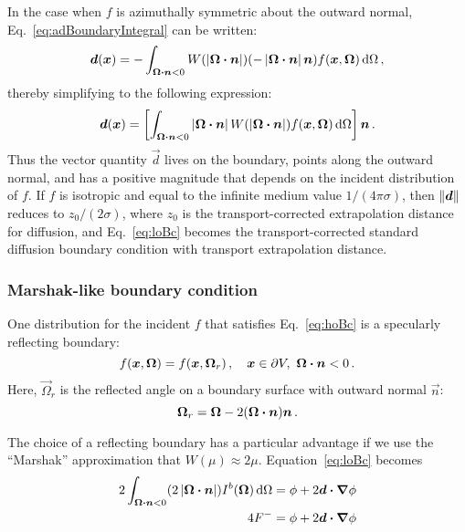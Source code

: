In the case when $f$ is azimuthally symmetric about the outward normal,
Eq.~\eqref{eq:adBoundaryIntegral} can be written:
\begin{equation*}
  \bm{d}(\bm{x}) = -\int_{\bm{\Omega}\bm{\cdot}\bm{n} < 0} W(\left| \bm{\Omega}\bm{\cdot}\bm{n} \right|)
  (-\left|  \bm{\Omega} \bm{\cdot} \bm{n} \right| \bm{n})
  f(\bm{x}, \bm{\Omega}) \mathop{}\!\mathrm{d}\Omega\,,
\end{equation*}
thereby simplifying to the following expression:
\begin{equation} \label{eq:adBoundaryIntegral2}
  \bm{d}(\bm{x})
  = \left[ \int_{\bm{\Omega}\bm{\cdot}\bm{n} < 0}
  \left| \bm{\Omega}\bm{\cdot}\bm{n} \right| W(\left| \bm{\Omega}\bm{\cdot}\bm{n} \right|)
  f(\bm{x}, \bm{\Omega}) \mathop{}\!\mathrm{d}\Omega\right] \bm{n}\,.
\end{equation}
Thus the vector quantity $\vec{d}$ lives on the boundary, points along the
outward normal, and has a positive magnitude that depends on the incident
distribution of $f$. If $f$ is isotropic and equal to the infinite medium value
$1/(4\pi\sigma)$, then $\left\| \bm{d} \right\|$ reduces to $z_0 / (2 \sigma)$, where
$z_0$ is the transport-corrected extrapolation distance for diffusion,
and Eq.~\eqref{eq:loBc} becomes the transport-corrected standard diffusion
boundary condition with transport extrapolation distance.

\subsubsection{Marshak-like boundary condition}

One distribution for the incident $f$ that satisfies
Eq.~\eqref{eq:hoBc} is a specularly reflecting boundary:
\begin{equation} \label{eq:zetaReflecting}
  f(\bm{x}, \bm{\Omega}) = f(\bm{x}, \bm{\Omega}_r) \,,
 \quad \bm{x} \in \partial V, \ \bm{\Omega} \bm{\cdot} \bm{n} < 0 \,.
\end{equation}
Here, $\vec{\Omega}_r$ is the reflected angle on a boundary surface with outward
normal $\vec{n}$:
\begin{equation} \label{eq:reflection}
  \bm{\Omega}_r = \bm{\Omega} - 2(\bm{\Omega} \bm{\cdot} \bm{n}) \bm{n}\,.
\end{equation}

The choice of a reflecting boundary has a particular advantage if we use the
``Marshak'' approximation
that $W(\mu)\approx 2\mu$. Equation~\eqref{eq:loBc} becomes
\begin{align*}
  2\int_{\bm{\Omega}\bm{\cdot} \bm{n} < 0}
  ( 2\left| \bm{\Omega} \bm{\cdot} \bm{n} \right| ) I^b(\bm{\Omega}) \mathop{}\!\mathrm{d}\Omega
  &= \phi
  + 2\bm{d} \bm{\cdot} \bm{\nabla} \phi
  \\
  4 F^-
  &= \phi
  + 2\bm{d} \bm{\cdot} \bm{\nabla} \phi
\end{align*}

